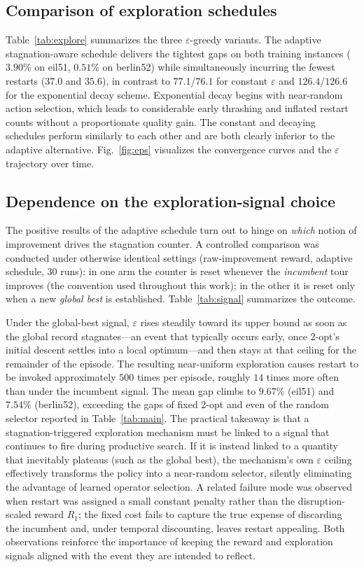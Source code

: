 \documentclass[10pt,twocolumn]{article}
\begin{document}
\subsection{Comparison of exploration schedules}
Table~\ref{tab:explore} summarizes the three $\varepsilon$-greedy variants. The
adaptive stagnation-aware schedule delivers the tightest gaps on both training
instances ($3.90\%$ on eil51, $0.51\%$ on berlin52) while simultaneously
incurring the fewest restarts ($37.0$ and $35.6$), in contrast to
$77.1$/$76.1$ for constant $\varepsilon$ and $126.4$/$126.6$ for the
exponential decay scheme. Exponential decay begins with near-random action
selection, which leads to considerable early thrashing and inflated restart
counts without a proportionate quality gain. The constant and decaying
schedules perform similarly to each other and are both clearly inferior to the
adaptive alternative. Fig.~\ref{fig:eps} visualizes the convergence curves and
the $\varepsilon$ trajectory over time.

\subsection{Dependence on the exploration-signal
choice}\label{sec:signal}
The positive results of the adaptive schedule turn out to hinge on
\emph{which} notion of improvement drives the stagnation counter. A controlled
comparison was conducted under otherwise identical settings (raw-improvement
reward, adaptive schedule, 30 runs): in one arm the counter is reset whenever
the \emph{incumbent} tour improves (the convention used throughout this work);
in the other it is reset only when a new \emph{global best} is established.
Table~\ref{tab:signal} summarizes the outcome.

Under the global-best signal, $\varepsilon$ rises steadily toward its upper
bound as soon as the global record stagnates---an event that typically occurs
early, once 2-opt's initial descent settles into a local optimum---and then
stays at that ceiling for the remainder of the episode. The resulting
near-uniform exploration causes restart to be invoked approximately $500$ times
per episode, roughly $14$ times more often than under the incumbent signal. The
mean gap climbs to $9.67\%$ (eil51) and $7.54\%$ (berlin52), exceeding the
gaps of fixed 2-opt and even of the random selector reported in
Table~\ref{tab:main}. The practical takeaway is that a stagnation-triggered
exploration mechanism must be linked to a signal that continues to fire during
productive search. If it is instead linked to a quantity that inevitably
plateaus (such as the global best), the mechanism's own $\varepsilon$ ceiling
effectively transforms the policy into a near-random selector, silently
eliminating the advantage of learned operator selection. A related failure mode
was observed when restart was assigned a small constant penalty rather than the
disruption-scaled reward $R_1$; the fixed cost fails to capture the true
expense of discarding the incumbent and, under temporal discounting, leaves
restart appealing. Both observations reinforce the importance of keeping the
reward and exploration signals aligned with the event they are intended to
reflect.
\end{document}
